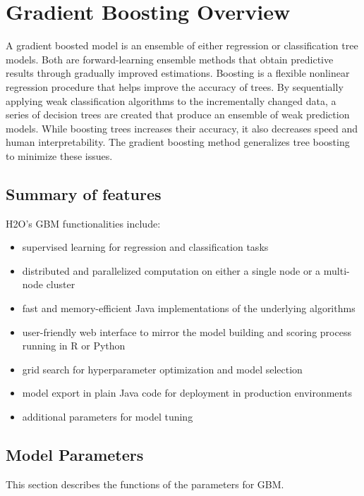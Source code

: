 \section{Gradient Boosting Overview}

A gradient boosted model is an ensemble of either regression or classification tree models.
Both are forward-learning ensemble methods that obtain predictive results through gradually improved estimations.
Boosting is a flexible nonlinear regression procedure that helps improve the accuracy of trees.
By sequentially applying weak classification algorithms to the incrementally changed data,
a series of decision trees are created that produce an ensemble of weak prediction models.
While boosting trees increases their accuracy, it also decreases speed and human interpretability.
The gradient boosting method generalizes tree boosting to minimize these issues.

\subsection{Summary of features}
H2O's GBM functionalities include:

\begin{itemize}
\item supervised learning for regression and classification tasks
\item distributed and parallelized computation on either a single node or a multi-node cluster
\item fast and memory-efficient Java implementations of the underlying algorithms
\item user-friendly web interface to mirror the model building and scoring process running in R or Python
\item grid search for hyperparameter optimization and model selection
\item model export in plain Java code for deployment in production environments
\item additional parameters for model tuning
\end{itemize}

\subsection{ Model Parameters}

This section describes the functions of the parameters for GBM. %

